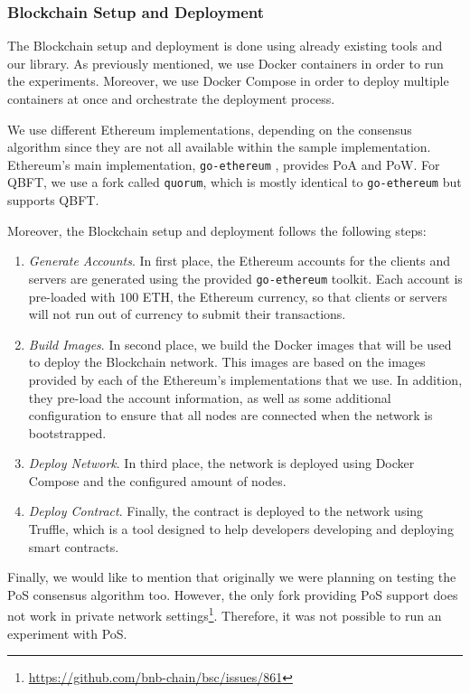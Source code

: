 \subsubsection{Blockchain Setup and Deployment}

The Blockchain setup and deployment is done using already existing tools and our library. As previously mentioned, we use Docker containers in order to run the experiments. Moreover, we use Docker Compose in order to deploy multiple containers at once and orchestrate the deployment process.

We use different Ethereum implementations, depending on the consensus algorithm since they are not all available within the sample implementation. Ethereum's main implementation, \texttt{go-ethereum} \cite{go-ethereum}, provides PoA and PoW. For QBFT, we use a fork called \texttt{quorum}\cite{quorum}, which is mostly identical to \texttt{go-ethereum} but supports QBFT.

Moreover, the Blockchain setup and deployment follows the following steps:

\begin{enumerate}
    \item \textit{Generate Accounts}. In first place, the Ethereum accounts for the clients and servers are generated using the provided \texttt{go-ethereum} toolkit. Each account is pre-loaded with $100$ ETH, the Ethereum currency, so that clients or servers will not run out of currency to submit their transactions.
    
    \item \textit{Build Images}. In second place, we build the Docker images that will be used to deploy the Blockchain network. This images are based on the images provided by each of the Ethereum's implementations that we use. In addition, they pre-load the account information, as well as some additional configuration to ensure that all nodes are connected when the network is bootstrapped.
    
    \item \textit{Deploy Network}. In third place, the network is deployed using Docker Compose and the configured amount of nodes.
    
    \item \textit{Deploy Contract}. Finally, the contract is deployed to the network using Truffle, which is a tool designed to help developers developing and deploying smart contracts.
\end{enumerate}

Finally, we would like to mention that originally we were planning on testing the PoS consensus algorithm too. However, the only fork providing PoS support does not work in private network settings\footnote{\url{https://github.com/bnb-chain/bsc/issues/861}}. Therefore, it was not possible to run an experiment with PoS.

